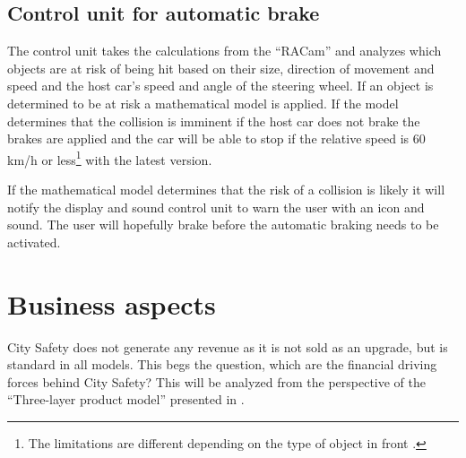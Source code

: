 \documentclass[conference]{IEEEtran}
\begin{document}
\subsection{Control unit for automatic brake}
The control unit takes the calculations from the ``RACam'' and analyzes which objects are at risk of being hit based on their size, direction of movement and speed and the host car's speed and angle of the steering wheel. If an object is determined to be at risk a mathematical model is applied. If the model determines that the collision is imminent if the host car does not brake the brakes are applied and the car will be able to stop if the relative speed is 60 km/h or less\footnote{The limitations are different depending on the type of object in front \cite{CitySafetyDefinition}.} with the latest version. \cite{SysDescription, CitySafetyDefinition}

If the mathematical model determines that the risk of a collision is likely it will notify the display and sound control unit to warn the user with an icon and sound. The user will hopefully brake before the automatic braking needs to be activated. \cite{CitySafetyDefinition}


\section{Business aspects}
City Safety does not generate any revenue as it is not sold as an upgrade, but is standard in all models. This begs the question, which are the financial driving forces behind City Safety? This will be analyzed from the perspective of the ``Three-layer product model'' presented in \cite{TeLESM}.
\end{document}
